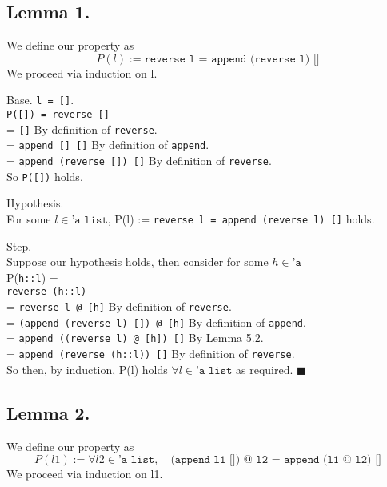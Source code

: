 \documentclass{article}
\begin{document}
\subsection {Lemma 1.}
We define our property as
\[ P(l) := \texttt{reverse l = append (reverse l) []} \]
We proceed via induction on l.

\bigskip

\noindent
Base. \texttt{l = []}. \\
\indent \texttt{P([]) = reverse []} \\
\indent = \texttt{[]} \qquad By definition of \texttt{reverse}. \\
\indent = \texttt{append [] []} \qquad By definition of \texttt{append}. \\
\indent = \texttt{append (reverse []) []} \qquad By definition of \texttt{reverse}. \\
\noindent So \texttt{P([])} holds.

\bigskip

\noindent
Hypothesis. \\
\indent For some $l \in \texttt{'a list}$, P(l) := \texttt{reverse l = append (reverse l) []} holds.

\bigskip

\noindent
Step. \\
Suppose our hypothesis holds, then consider for some $h \in \texttt{'a}$ \\
\indent P(\texttt{h::l}) = \\
\indent \texttt{reverse (h::l)} \\
\indent = \texttt{reverse l @ [h]} \qquad By definition of \texttt{reverse}. \\
\indent = \texttt{(append (reverse l) []) @ [h]} \qquad By definition of \texttt{append}. \\
\indent = \texttt{append ((reverse l) @ [h]) []} \qquad By Lemma 5.2. \\
\indent = \texttt{append (reverse (h::l)) []} \qquad By definition of \texttt{reverse}. \\
\noindent So then, by induction, P(l) holds $\forall l \in \texttt{'a list}$ as
required. $\blacksquare$





\subsection {Lemma 2.}
We define our property as
\[ P(l1) := \forall l2 \in \texttt{'a list}, \quad \texttt{(append l1 []) @ l2 = append (l1 @ l2) []} \]
We proceed via induction on l1.
\end{document}
